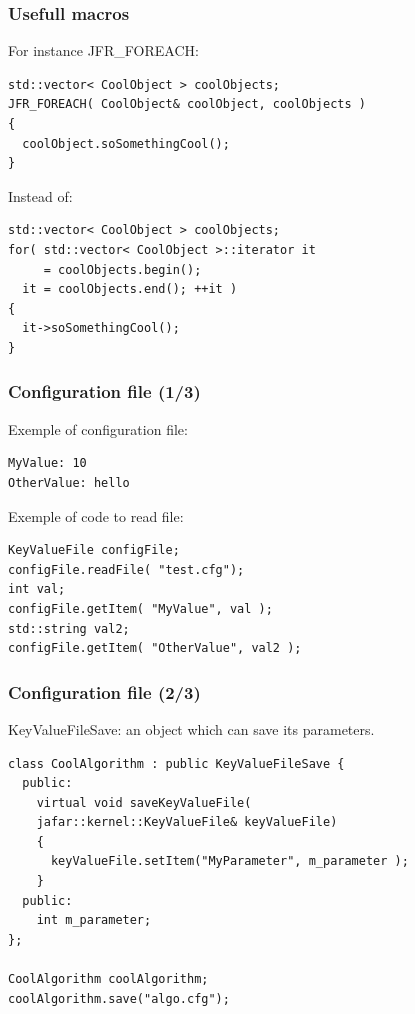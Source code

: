 \documentclass[compress]{beamer}
\begin{document}

\begin{frame}[fragile]
  \frametitle{Usefull macros}
  For instance JFR\_FOREACH:
  \begin{lstlisting}
std::vector< CoolObject > coolObjects;
JFR_FOREACH( CoolObject& coolObject, coolObjects )
{
  coolObject.soSomethingCool();
}
  \end{lstlisting}
  Instead of:
  \begin{lstlisting}
std::vector< CoolObject > coolObjects;
for( std::vector< CoolObject >::iterator it
     = coolObjects.begin();
  it = coolObjects.end(); ++it )
{
  it->soSomethingCool();
}
  \end{lstlisting}
\end{frame}


\begin{frame}[fragile]
  \frametitle{Configuration file (1/3)}
Exemple of configuration file:
\begin{lstlisting}
MyValue: 10
OtherValue: hello
\end{lstlisting}
  
Exemple of code to read file:
\begin{lstlisting}
KeyValueFile configFile;
configFile.readFile( "test.cfg");
int val;
configFile.getItem( "MyValue", val );
std::string val2;
configFile.getItem( "OtherValue", val2 );
\end{lstlisting}


\end{frame}


\begin{frame}[fragile]
  \frametitle{Configuration file (2/3)}
KeyValueFileSave: an object which can save its parameters.
 
\begin{lstlisting}
class CoolAlgorithm : public KeyValueFileSave {
  public:
    virtual void saveKeyValueFile(
    jafar::kernel::KeyValueFile& keyValueFile)
    {
      keyValueFile.setItem("MyParameter", m_parameter );
    }
  public:
    int m_parameter;
};

CoolAlgorithm coolAlgorithm;
coolAlgorithm.save("algo.cfg");

\end{lstlisting}
 
\end{frame}
\end{document}
